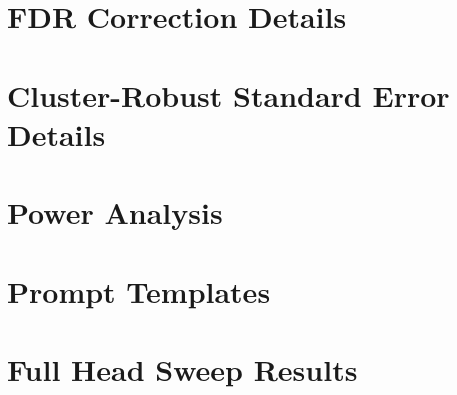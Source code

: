 \documentclass{article}
\begin{document}
\section{FDR Correction Details}
\label{app:fdr}

\section{Cluster-Robust Standard Error Details}
\label{app:cluster}

\section{Power Analysis}
\label{app:power}

\section{Prompt Templates}
\label{app:prompts}

\section{Full Head Sweep Results}
\label{app:heads}
\end{document}
